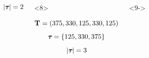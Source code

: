 \begin{frame}
\begin{columns}[c]
\begin{onlyenv}
\begin{displaybox}[4.5cm]
                \[
                    \lvert \boldsymbol{\tau_{}} \rvert = 2
                \]\vspace{0mm}
            \end{displaybox}
            \end{onlyenv}
            \begin{onlyenv}<8>
            \begin{displaybox}[4.5cm]
                {\small
                \[
                    \mathbf{T_{}} = (375,330,125,330,125)
                \]\vspace{0mm}
                }
                \[
                    \boldsymbol{\tau_{}} = \{125,330,375\}
                \]\vspace{0mm}
                \[
                    \lvert \boldsymbol{\tau_{}} \rvert = 3
                \]\vspace{0mm}
            \end{displaybox}
            \end{onlyenv}
            \begin{onlyenv}<9->
            \begin{displaybox}[4.5cm]

\end{displaybox}
\end{onlyenv}
\end{columns}
\end{frame}
